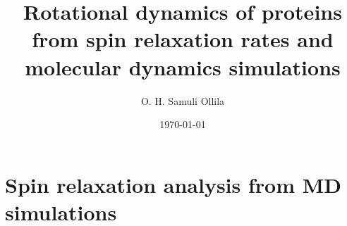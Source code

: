 \documentclass[pre,aps,floatfix,authordate1-4,twocolumn]{revtex4-1}
\begin{document}

\title{Rotational dynamics of proteins from spin relaxation rates and molecular dynamics simulations} %



\author{O. H. Samuli Ollila}


\date{\today}

\begin{abstract}
  
\end{abstract}


\maketitle %




\section{Spin relaxation analysis from MD simulations}
\end{document}

